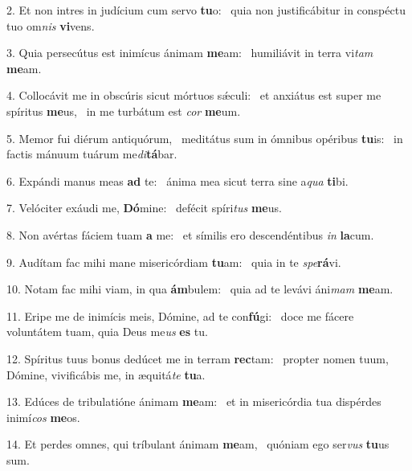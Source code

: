 2. Et non intres in judícium cum servo \textbf{tu}o: \ast\  quia non justificábitur in conspéctu tuo om\textit{nis} \textbf{vi}vens.\

3. Quia persecútus est inimícus ánimam \textbf{me}am: \ast\  humiliávit in terra vi\textit{tam} \textbf{me}am.\

4. Collocávit me in obscúris sicut mórtuos sǽculi: \dag\  et anxiátus est super me spíritus \textbf{me}us, \ast\  in me turbátum est \textit{cor} \textbf{me}um.\

5. Memor fui diérum antiquórum, \dag\  meditátus sum in ómnibus opéribus \textbf{tu}is: \ast\  in factis mánuum tuárum me\textit{di}\textbf{tá}bar.\

6. Expándi manus meas \textbf{ad} te: \ast\  ánima mea sicut terra sine a\textit{qua} \textbf{ti}bi.\

7. Velóciter exáudi me, \textbf{Dó}mine: \ast\  defécit spíri\textit{tus} \textbf{me}us.\

8. Non avértas fáciem tuam \textbf{a} me: \ast\  et símilis ero descendéntibus \textit{in} \textbf{la}cum.\

9. Audítam fac mihi mane misericórdiam \textbf{tu}am: \ast\  quia in te \textit{spe}\textbf{rá}vi.\

10. Notam fac mihi viam, in qua \textbf{ám}bulem: \ast\  quia ad te levávi áni\textit{mam} \textbf{me}am.\

11. Eripe me de inimícis meis, Dómine, ad te con\textbf{fú}gi: \ast\  doce me fácere voluntátem tuam, quia Deus me\textit{us} \textbf{es} tu.\

12. Spíritus tuus bonus dedúcet me in terram \textbf{rec}tam: \ast\  propter nomen tuum, Dómine, vivificábis me, in æquitá\textit{te} \textbf{tu}a.\

13. Edúces de tribulatióne ánimam \textbf{me}am: \ast\  et in misericórdia tua dispérdes inimí\textit{cos} \textbf{me}os.\

14. Et perdes omnes, qui tríbulant ánimam \textbf{me}am, \ast\  quóniam ego ser\textit{vus} \textbf{tu}us sum.\

